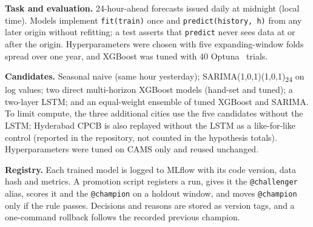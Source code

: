 \documentclass[conference]{IEEEtran}
\begin{document}
\textbf{Task and evaluation.} 24-hour-ahead forecasts issued daily at midnight (local time).
Models implement \texttt{fit(train)} once and \texttt{predict(history, h)} from any later origin
without refitting; a test asserts that \texttt{predict} never sees data at or after the origin.
Hyperparameters were chosen with five expanding-window folds spread over one year, and XGBoost was
tuned with 40 Optuna~\cite{akiba2019} trials.

\textbf{Candidates.} Seasonal naive (same hour yesterday); SARIMA(1,0,1)(1,0,1)\textsubscript{24}
on log values; two direct multi-horizon XGBoost models (hand-set and tuned); a two-layer LSTM;
and an equal-weight ensemble of tuned XGBoost and SARIMA. To limit compute, the three additional
cities use the five candidates without the LSTM; Hyderabad CPCB is also replayed without the LSTM
as a like-for-like control (reported in the repository, not counted in the hypothesis totals).
Hyperparameters were tuned on CAMS only and reused unchanged.

\textbf{Registry.} Each trained model is logged to MLflow with its code version, data hash and
metrics. A promotion script registers a run, gives it the \texttt{@challenger} alias, scores it
and the \texttt{@champion} on a holdout window, and moves \texttt{@champion} only if the rule
passes. Decisions and reasons are stored as version tags, and a one-command rollback follows the
recorded previous champion.
\end{document}
